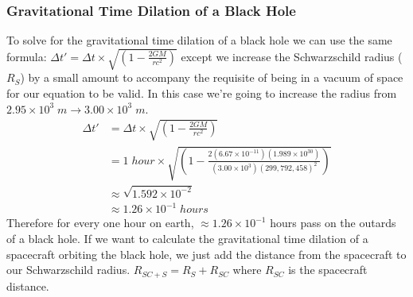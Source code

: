 \documentclass{article}
\begin{document}
\subsubsection{Gravitational Time Dilation of a Black Hole}
To solve for the gravitational time dilation of a black hole we can use the same formula: $\Delta t\prime = \Delta t\times\sqrt{(1-\frac{2GM}{rc^2})}$ except we increase the Schwarzschild radius ($R_{S}$) by a small amount to accompany the requisite of being in a vacuum of space for our equation to be valid. In this case we're going to increase the radius from $2.95 \times 10^{3}\; m \to 3.00 \times 10^{3}\; m$.
\vspace{-0.2cm}
\begin{align*}
    \Delta t\prime & = \Delta t\times\sqrt{(1-\frac{2GM}{rc^2})}                                                                          \\
                   & = 1\; hour \times\sqrt{(1-\frac{2(6.67 \times 10^{-11})(1.989\times 10^{30})}{(3.00 \times 10^{3})(299,792,458)^2})} \\
                   & \approx \sqrt{1.592\times10^{-2}}                                                                                    \\
                   & \approx 1.26 \times 10^{-1} \; hours
\end{align*}
Therefore for every one hour on earth, $\approx 1.26 \times 10^{-1}$ hours pass on the outards of a black hole.
If we want to calculate the gravitational time dilation of a spacecraft orbiting the black hole, we just add the distance from the spacecraft to our Schwarzschild radius. $R_{SC + S} = R_S + R_{SC}$ where $R_{SC}$ is the spacecraft distance.
\end{document}
